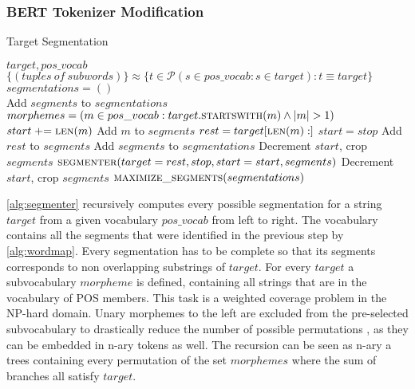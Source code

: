 
\subsubsection{BERT Tokenizer Modification}
\label{subsubsec:tokenizer-modification}


\begin{algorithm}
    \caption{Target Segmentation}\label{alg:segmenter}
    \begin{algorithmic}[1]
        \Require $target,pos\_vocab$ 
        \Ensure $\{(tuples\:of\:subwords)\} \approx \{ t \in \mathcal{P} (s \in pos\_vocab : s \in target) : t \equiv target\}$
        \\
        \State $segmentations = ()$
        \\

            \State Add $segments$ to $segmentations$
        \Else
            \State $morphemes = (m \in pos\_vocab : target. \textsc{startswith}(m) \wedge |m|>1)$
                \State $start \mathrel{+}= \textsc{len}(m)$
                \State Add $m$ to $segments$
                \State $rest = target[\textsc{len}(m):]$
                    \State $start = stop$
                    \State Add $rest$ to $segments$
                    \State Add $segments$ to $segmentations$
                    \State Decrement $start$, crop $segments$
                \Else
                    \State $\textsc{segmenter}(target=rest, stop, start=start, segments)$
                    \State Decrement $start$, crop $segments$
                \EndIf
            \EndFor
        \EndIf
        \EndFunction
        \State $\textsc{maximize\_segments}(segmentations)$
    \end{algorithmic}
\end{algorithm}

\autoref{alg:segmenter} recursively computes every possible segmentation for a string $target$ from a given vocabulary $pos\_vocab$ from left to right.
The vocabulary contains all the segments that were identified in the previous step by \autoref{alg:wordmap}.
Every segmentation has to be complete so that its segments corresponds to non overlapping substrings of $target$.
For every $target$ a subvocabulary $morpheme$ is defined, containing all strings that are in the vocabulary of \ac{POS} \- members.
This task is a weighted coverage problem in the \uppercase{NP}-hard domain.
Unary morphemes to the left are excluded from the pre-selected subvocabulary to drastically reduce the number of possible permutations , as they can be embedded in n-ary tokens as well.
The recursion can be seen as n-ary a trees containing every permutation of the set $morphemes$ where the sum of branches all satisfy $target$.

